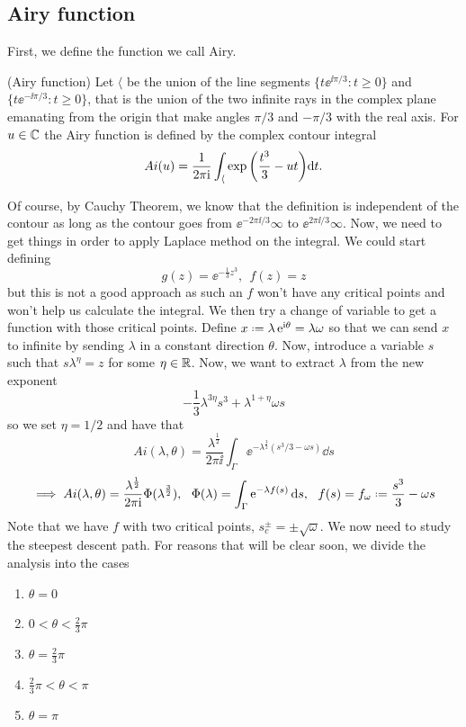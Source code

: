 \subsection{Airy function}
\label{Subsection: Airy Asymptotic}

First, we define the function we call Airy. 

\begin{definition}
	(Airy function) Let $\langle$ be the union of the line segments $\{t\ee^{\ii \pi/3} : t \geq 0\}$ and $\{ t\ee^{-\ii\pi/3}: t \geq 0\}$, that is the union of the two infinite rays in the complex plane emanating from the origin that make	angles $\pi/3$ and $-\pi/3$ with the real axis. For $u \in \mathbb{C}$ the Airy function is defined by the
	complex contour integral
	\begin{equation}
		Ai(u) = \frac{1}{2\pi\mathrm{i}} \int_{\langle} \exp{\left(\frac{t^3}{3} - ut\right)} \mathrm{d} t.
	\end{equation}
	\label{Def: Airy Function}
\end{definition}
Of course, by Cauchy Theorem, we know that the definition is independent of the contour as long as the contour goes from $\ee^{-2\pi\ii / 3}\infty$ to $\ee^{2\pi\ii / 3}\infty$. Now, we need to get things in order to apply Laplace method on the integral. We could start defining
$$g(z) = \ee^{-\frac{1}{3} z^3}, \ \ f(z) = z$$
but this is not a good approach as such an $f$ won't have any critical points and won't help us calculate the integral. We then try a change of variable to get a function with those critical points. Define $x \deff \lambda \ee^{\ii \theta} = \lambda \omega$ so that we can send $x$ to infinite by sending $\lambda$ in a constant direction $\theta$. Now, introduce a variable $s$ such that $s\lambda^{\eta} = z$ for some $\eta \in \mathbb{R}$. Now, we want to extract $\lambda$ from the new exponent 
$$-\frac{1}{3}\lambda^{3\eta}s^3 + \lambda^{1+\eta} \omega s$$
so we set $\eta = 1/2$ and have that
$$Ai(\lambda, \theta) = \frac{\lambda^{\frac{1}{2}}}{2\pi \ii} \int_{\Gamma} \ee^{-\lambda^{\frac{3}{2}}(s^3/3 - \omega s)} \dd s$$
$$\implies Ai(\lambda, \theta) = \frac{\lambda^{\frac{1}{2}}}{2\pi \ii}\Phi(\lambda^{\frac{3}{2}}) , \ \ \Phi(\lambda) = \int_{\Gamma} \ee^{-\lambda f(s)} \dd s, \ \ f(s) = f_{\omega} \deff \frac{s^3}{3} - \omega s $$ 
Note that we have $f$ with two critical points, $s_c^{\pm} = \pm \sqrt{\omega}$. We now need to study the steepest descent path. For reasons that will be clear soon, we divide the analysis into the cases
\begin{enumerate}
	\item $\theta = 0$
	\item $0< \theta < \frac{2}{3} \pi$	
	\item $\theta = \frac{2}{3} \pi$
	\item $\frac{2}{3} \pi < \theta < \pi$
	\item $\theta  = \pi$
\end{enumerate}

